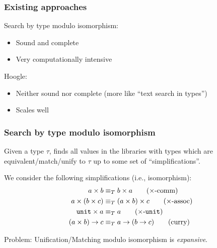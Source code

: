 \documentclass[aspectratio=169,dvipsnames,svgnames,10pt]{beamer}
\newcommand\Y{{\color{Green}{\ding{52}}}\xspace}
\newcommand\N{{\color{Red}{\ding{56}}}\xspace}
\begin{document}
\begin{frame}
  \frametitle{Existing approaches}

  {\large Search by type modulo isomorphism}:
  \begin{itemize}
  \item Sound and complete \Y
  \item Very computationally intensive \N
  \end{itemize}

  \vfill

  {\large Hoogle}:
  \begin{itemize}
  \item Neither sound nor complete (more like ``text search in types'') \N
  \item Scales well \Y
  \end{itemize}
\end{frame}

\begin{frame}
  \frametitle{Search by type modulo isomorphism}

  Given a type $\tau$, finds all values in the libraries with types which are equivalent/match/unify to $\tau$ up to some set of ``simplifications''.

  We consider the following simplifications (i.e., isomorphism):
\begin{align}
    a \times b &\equiv_T
    b \times a
    \label{prod_comm}
    \tag{$\times$-comm}
  \\
    a \times (b \times c) &\equiv_T
    (a \times b) \times c
    \label{prod_assoc}
    \tag{$\times$-assoc}
  \\
    \texttt{unit} \times a &\equiv_T
    a
    \label{prod_unit}
    \tag{$\times$-$\texttt{unit}$}
  \\
    (a \times b) \rightarrow c &\equiv_T
    a \rightarrow (b \rightarrow c)
    \label{curry}
    \tag{curry}
\end{align}
  
  Problem: Unification/Matching modulo isomorphism is \emph{expansive}.
\end{frame}
\end{document}
